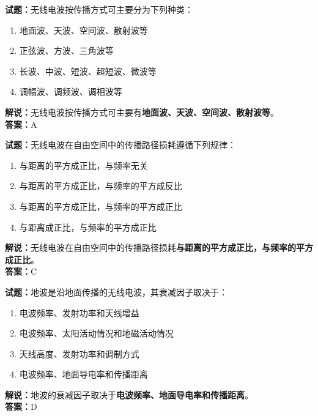 \documentclass{ctexbook}
\begin{document}
\bigskip


\noindent\textbf{试题：}无线电波按传播方式可主要分为下列种类：

\begin{enumerate}[leftmargin=3em]
	\item 地面波、天波、空间波、散射波等
	\item 正弦波、方波、三角波等
	\item 长波、中波、短波、超短波、微波等
	\item 调幅波、调频波、调相波等
\end{enumerate}

\noindent\textbf{解说：}无线电波按传播方式可主要有\textbf{地面波、天波、空间波、散射波等}。\\\noindent\textbf{答案：}A


\bigskip


\noindent\textbf{试题：}无线电波在自由空间中的传播路径损耗遵循下列规律：

\begin{enumerate}[leftmargin=3em]
	\item 与距离的平方成正比，与频率无关
	\item 与距离的平方成正比，与频率的平方成反比
	\item 与距离的平方成正比，与频率的平方成正比
	\item 与距离成正比，与频率的平方成正比
\end{enumerate}

\noindent\textbf{解说：}无线电波在自由空间中的传播路径损耗\textbf{与距离的平方成正比，与频率的平方成正比}。\\\noindent\textbf{答案：}C


\bigskip


\noindent\textbf{试题：}地波是沿地面传播的无线电波，其衰减因子取决于：

\begin{enumerate}[leftmargin=3em]
	\item 电波频率、发射功率和天线增益
	\item 电波频率、太阳活动情况和地磁活动情况
	\item 天线高度、发射功率和调制方式
	\item 电波频率、地面导电率和传播距离
\end{enumerate}

\noindent\textbf{解说：}地波的衰减因子取决于\textbf{电波频率、地面导电率和传播距离}。\\\noindent\textbf{答案：}D

\bigskip
\end{document}
